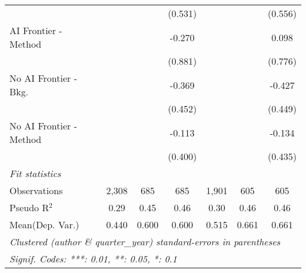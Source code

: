 \begin{tabular}{lcccccc}
                           &              &               & (0.531)       &                &               & (0.556)\\   
   AI Frontier - Method    &              &               & -0.270        &                &               & 0.098\\   
                           &              &               & (0.881)       &                &               & (0.776)\\   
   No AI Frontier - Bkg.   &              &               & -0.369        &                &               & -0.427\\   
                           &              &               & (0.452)       &                &               & (0.449)\\   
   No AI Frontier - Method &              &               & -0.113        &                &               & -0.134\\   
                           &              &               & (0.400)       &                &               & (0.435)\\   
   \midrule
   \emph{Fit statistics}\\
   Observations            & 2,308        & 685           & 685           & 1,901          & 605           & 605\\  
   Pseudo R$^2$            & 0.29         & 0.45          & 0.46          & 0.30           & 0.46          & 0.46\\  
Mean(Dep. Var.) & 0.440 & 0.600 & 0.600 & 0.515 & 0.661 & 0.661 \\
   \midrule \midrule
   \multicolumn{7}{l}{\emph{Clustered (author \& quarter\_year) standard-errors in parentheses}}\\
   \multicolumn{7}{l}{\emph{Signif. Codes: ***: 0.01, **: 0.05, *: 0.1}}\\
\end{tabular}
\par\endgroup
